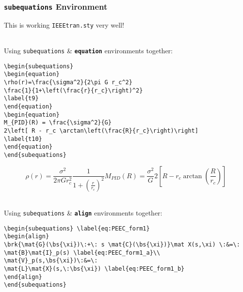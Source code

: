 \subsubsection{\texttt{\Large subequations} Environment}
This is working \texttt{IEEEtran.sty} very well!
%
%
\par \raggedright{}\\
Using \texttt{subequations} \& \texttt{\textbf{equation}} environments together:
%
\begin{verbatim}
\begin{subequations}
\begin{equation}
\rho(r)=\frac{\sigma^2}{2\pi G r_c^2}
\frac{1}{1+\left(\frac{r}{r_c}\right)^2}
\label{t9}
\end{equation}
\begin{equation}
M_{PID}(R) = \frac{\sigma^2}{G}
2\left[ R - r_c \arctan\left(\frac{R}{r_c}\right)\right]
\label{t10}
\end{equation}
\end{subequations}
\end{verbatim}
%
%
\begin{subequations}
	\begin{equation}
	\rho(r)=\frac{\sigma^2}{2\pi G r_c^2}
	\frac{1}{1+\left(\frac{r}{r_c}\right)^2}
	\label{t11}
	\end{equation}
	\begin{equation}
	M_{PID}(R) = \frac{\sigma^2}{G}
	2\left[ R - r_c \arctan\left(\frac{R}{r_c}\right)\right]
	\label{t12}
	\end{equation}
\end{subequations}
%
%
\raggedright{}\\
Using \texttt{subequations} \& \textbf{\texttt{align}} environments together:
%
%
\begin{verbatim}
\begin{subequations} \label{eq:PEEC_form1}
\begin{align}
\brk{\mat{G}(\bs{\xi})\:+\: s \mat{C}(\bs{\xi})}\mat X(s,\xi) \:&=\:
\mat{B}\mat{I}_p(s) \label{eq:PEEC_form1_a}\\
\mat{V}_p(s,\bs{\xi})\:&=\:
\mat{L}\mat{X}(s,\:\bs{\xi}) \label{eq:PEEC_form1_b}
\end{align}
\end{subequations}
\end{verbatim}
